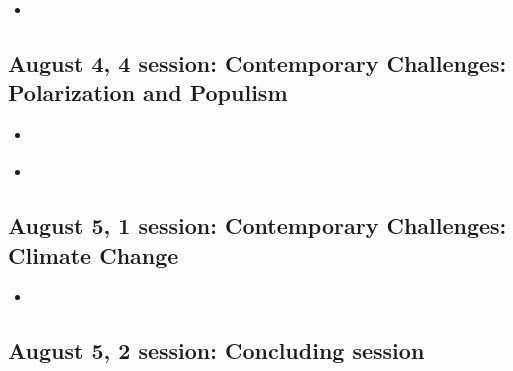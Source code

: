 \documentclass[11p,a4]{article}
\begin{document}
\begin{itemize}
    \item \citet{hager2019attitudes}
\end{itemize}				
				
\subsection*{August 4, 4 session: Contemporary Challenges: Polarization and Populism}
				
\begin{itemize}
    \item \citet{Hansen2024}
\item \citet{Arzheimer2015}
\end{itemize}				
				
\subsection*{August 5, 1 session: Contemporary Challenges: Climate Change}				
				
	\begin{itemize}
	    \item \citet{McCright03032016}
	\end{itemize}
				
\subsection*{August 5, 2 session: Concluding session}				




\end{document}
